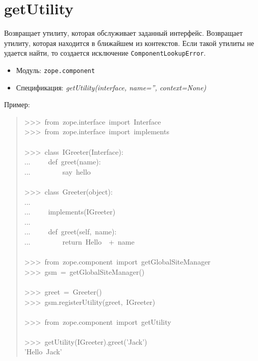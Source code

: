 \documentclass[14pt,a4paper,openany,twoside,final]{extbook}
\providecommand*{\DUroletitlereference}[1]{\textsl{#1}}
\begin{document}
\section*{getUtility%
  \label{getutility}%
}

Возвращает утилиту, которая обслуживает заданный интерфейс.
Возвращает утилиту, которая находится в ближайшем из контекстов.  Если
такой утилиты не удается найти, то создается исключение
\texttt{ComponentLookupError}.

\begin{itemize}

\item Модуль: \texttt{zope.component}

\item Спецификация: \DUroletitlereference{getUtility(interface, name='', context=None)}

\end{itemize}

Пример:

\begin{quote}{\ttfamily \raggedright \noindent
>{}>{}>~from~zope.interface~import~Interface\\
>{}>{}>~from~zope.interface~import~implements\\
~\\
>{}>{}>~class~IGreeter(Interface):\\
...~~~~~def~greet(name):\\
...~~~~~~~~~\textquotedbl{}say~hello\textquotedbl{}\\
~\\
>{}>{}>~class~Greeter(object):\\
...\\
...~~~~~implements(IGreeter)\\
...\\
...~~~~~def~greet(self,~name):\\
...~~~~~~~~~return~\textquotedbl{}Hello~\textquotedbl{}~+~name\\
~\\
>{}>{}>~from~zope.component~import~getGlobalSiteManager\\
>{}>{}>~gsm~=~getGlobalSiteManager()\\
~\\
>{}>{}>~greet~=~Greeter()\\
>{}>{}>~gsm.registerUtility(greet,~IGreeter)\\
~\\
>{}>{}>~from~zope.component~import~getUtility\\
~\\
>{}>{}>~getUtility(IGreeter).greet('Jack')\\
'Hello~Jack'
}
\end{quote}
\end{document}
